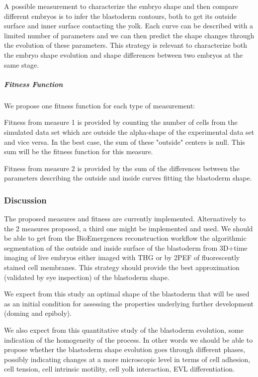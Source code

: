   A possible measurement to characterize the embryo shape and then compare different embryos is to infer the blastoderm contours, both to get its outside surface and inner surface contacting the yolk. Each curve can be described with a limited number of parameters and we can then predict the shape changes through the evolution of these parameters. This strategy is relevant to characterize both the embryo shape evolution and shape differences between two embryos at the same stage.  

\subparagraph{Fitness Function}

  We propose one fitness function for each type of measurement:  

  Fitness from measure 1 is provided by counting the number of cells from the simulated data set which are outside the alpha-shape of the experimental data set and vice versa. In the best case, the sum of these "outside" centers is null. This sum will be the fitness function for this measure.   

  Fitness from measure 2 is provided by the sum of the differences between the parameters describing the outside and inside curves fitting the blastoderm shape.  

\subsubsection{Discussion  }

   The proposed measures and fitness are currently implemented. Alternatively to the 2 measures proposed, a third one might be implemented and used. We should be able to get from the BioEmergences reconstruction workflow the algorithmic segmentation of the outside and inside surface of the blastoderm from 3D+time imaging of live embryos either imaged with THG or by 2PEF of fluorescently stained cell membranes. This strategy should provide the best approximation (validated by eye inspection) of the blastoderm shape.   

  We expect from this study an optimal shape of the blastoderm that will be used as an initial condition for assessing the properties underlying further development (doming and epiboly). 

  We also expect from this quantitative study of the blastoderm evolution, some indication of the homogeneity of the process. In other words we should be able to propose whether the blastoderm shape evolution goes through different phases, possibly indicating changes at a more microscopic level in terms of cell adhesion, cell tension, cell intrinsic motility, cell yolk interaction, EVL differentiation. 

